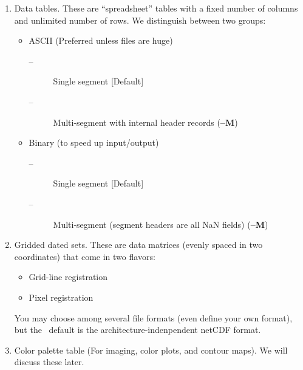 \documentclass{report}
\begin{document}
\begin{enumerate}

\item Data tables.
These are ``spreadsheet'' tables with a fixed number of columns and
unlimited number of rows.  We distinguish between two groups:

\begin{itemize}

\item ASCII (Preferred unless files are huge)

\begin{description}

\item [--] Single segment [Default]

\item [--] Multi-segment with internal header records ({\bf --M})
\end{description}

\item Binary (to speed up input/output)

\begin{description}

\item [--] Single segment [Default]

\item [--] Multi-segment (segment headers are all NaN fields) ({\bf --M})
\end{description}

\end{itemize}

\item Gridded dated sets.
These are data matrices (evenly spaced in two coordinates) that come
in two flavors:

\begin{itemize}

\item Grid-line registration

\item Pixel registration

\end{itemize}

You may choose among several file formats (even define your own format),
but the \GMT\ default is the architecture-indenpendent netCDF format.

\item Color palette table (For imaging, color plots, and contour maps).
We will discuss these later.

\end{enumerate}
\end{document}
